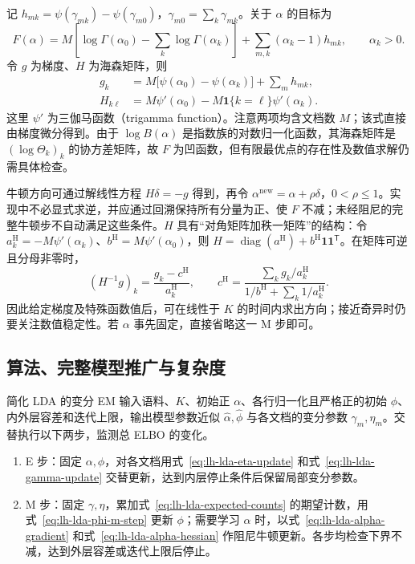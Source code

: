 记 $h_{mk}=\psi(\gamma_{mk})-\psi(\gamma_{m0})$，$\gamma_{m0}=\sum_k\gamma_{mk}$。关于 $\alpha$ 的目标为
\begin{equation}
F(\alpha)=M\left[\log\Gamma(\alpha_0)-\sum_k\log\Gamma(\alpha_k)\right]
+\sum_{m,k}(\alpha_k-1)h_{mk},\qquad\alpha_k>0.
\label{eq:lh-lda-alpha-objective}
\end{equation}
令 $g$ 为梯度、$H$ 为海森矩阵，则
\begin{align}
g_k&=M\bigl[\psi(\alpha_0)-\psi(\alpha_k)\bigr]+\sum_mh_{mk},
\label{eq:lh-lda-alpha-gradient}\\
H_{k\ell}&=M\psi'(\alpha_0)-M\mathbf1\{k=\ell\}\psi'(\alpha_k).
\label{eq:lh-lda-alpha-hessian}
\end{align}
这里 $\psi'$ 为三伽马函数（trigamma function）。注意两项均含文档数 $M$；该式直接由梯度微分得到。由于 $\log B(\alpha)$ 是指数族的对数归一化函数，其海森矩阵是 $(\log\Theta_k)_k$ 的协方差矩阵，故 $F$ 为凹函数，但有限最优点的存在性及数值求解仍需具体检查。

牛顿方向可通过解线性方程 $H\delta=-g$ 得到，再令 $\alpha^{\mathrm{new}}=\alpha+\rho\delta$，$0<\rho\leq1$。实现中不必显式求逆，并应通过回溯保持所有分量为正、使 $F$ 不减；未经阻尼的完整牛顿步不自动满足这些条件。$H$ 具有“对角矩阵加秩一矩阵”的结构：令 $a_k^{\mathrm H}=-M\psi'(\alpha_k)$、$b^{\mathrm H}=M\psi'(\alpha_0)$，则 $H=\operatorname{diag}(a^{\mathrm H})+b^{\mathrm H}\mathbf1\mathbf1^{\mathsf T}$。在矩阵可逆且分母非零时，
\begin{equation}
(H^{-1}g)_k=\frac{g_k-c^{\mathrm H}}{a_k^{\mathrm H}},\qquad
c^{\mathrm H}=\frac{\sum_kg_k/a_k^{\mathrm H}}
{1/b^{\mathrm H}+\sum_k1/a_k^{\mathrm H}}.
\label{eq:lh-lda-alpha-newton-structure}
\end{equation}
因此给定梯度及特殊函数值后，可在线性于 $K$ 的时间内求出方向；接近奇异时仍要关注数值稳定性。若 $\alpha$ 事先固定，直接省略这一 M 步即可。

\subsection{算法、完整模型推广与复杂度}
\label{subsec:lh-lda-variational-algorithm}

简化 LDA 的变分 EM 输入语料、$K$、初始正 $\alpha$、各行归一化且严格正的初始 $\phi$、内外层容差和迭代上限，输出模型参数近似 $\widehat\alpha,\widehat\phi$ 与各文档的变分参数 $\gamma_m,\eta_m$。交替执行以下两步，监测总 ELBO 的变化。
\begin{enumerate}
\item E 步：固定 $\alpha,\phi$，对各文档用式~\eqref{eq:lh-lda-eta-update} 和式~\eqref{eq:lh-lda-gamma-update} 交替更新，达到内层停止条件后保留局部变分参数。
\item M 步：固定 $\gamma,\eta$，累加式~\eqref{eq:lh-lda-expected-counts} 的期望计数，用式~\eqref{eq:lh-lda-phi-m-step} 更新 $\phi$；需要学习 $\alpha$ 时，以式~\eqref{eq:lh-lda-alpha-gradient} 和式~\eqref{eq:lh-lda-alpha-hessian} 作阻尼牛顿更新。各步均检查下界不减，达到外层容差或迭代上限后停止。
\end{enumerate}


